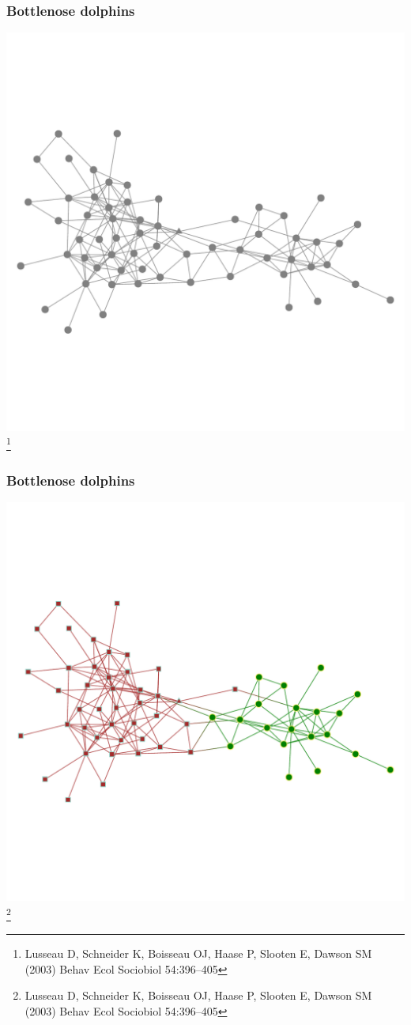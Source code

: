 \documentclass{beamer}
\begin{document}
\begin{frame}
    \frametitle{Bottlenose dolphins}
    \centering
    \includegraphics[width=\columnwidth, trim = 0 120 0 100, clip = true]{dolphins.pdf}
\footnote{\footnotesize Lusseau D, Schneider K, Boisseau OJ, Haase P, Slooten E, Dawson SM (2003) Behav Ecol Sociobiol 54:396–405}
\end{frame}
\begin{frame}
    \frametitle{Bottlenose dolphins}
    \centering
    \includegraphics[width=\columnwidth, trim = 0 120 0 100, clip = true]{dolphins2.pdf}
\footnote{\footnotesize Lusseau D, Schneider K, Boisseau OJ, Haase P, Slooten E, Dawson SM (2003) Behav Ecol Sociobiol 54:396–405}
\end{frame}
\end{document}
